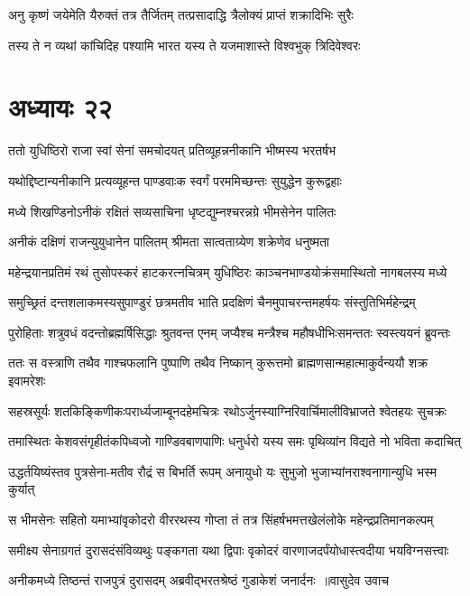 \twolineshloka
{अनु कृष्णं जयेमेति यैरुक्तं तत्र तैर्जितम्}
{तत्प्रसादाद्धि त्रैलोक्यं प्राप्तं शक्रादिभिः सुरैः}


\twolineshloka
{तस्य ते न व्यथां कांचिदिह पश्यामि भारत}
{यस्य ते यजमाशास्ते विश्वभुक् त्रिदिवेश्वरः}


\chapter{अध्यायः २२}
\twolineshloka
{ततो युधिष्ठिरो राजा स्वां सेनां समचोदयत्}
{प्रतिव्यूहन्ननीकानि भीष्मस्य भरतर्षभ}


\twolineshloka
{यथोद्दिष्टान्यनीकानि प्रत्यव्यूहन्त पाण्डवाःक}
{स्वर्गं परममिच्छन्तः सुयुद्धेन कुरूद्वहाः}


\twolineshloka
{मध्ये शिखण्डिनोऽनीकं रक्षितं सव्यसाचिना}
{धृष्टद्युम्नश्चरन्नग्रे भीमसेनेन पालितः}


\twolineshloka
{अनीकं दक्षिणं राजन्युयुधानेन पालितम्}
{श्रीमता सात्वताग्र्येण शक्रेणेव धनुष्मता}


\twolineshloka
{महेन्द्रयानप्रतिमं रथं तुसोपस्करं हाटकरत्नचित्रम्}
{युधिष्ठिरः काञ्चनभाण्डयोक्रंसमास्थितो नागबलस्य मध्ये}


\twolineshloka
{समुच्छ्रितं दन्तशलाकमस्यसुपाण्डुरं छत्रमतीव भाति}
{प्रदक्षिणं चैनमुपाचरन्तमहर्षयः संस्तुतिभिर्महेन्द्रम्}


\twolineshloka
{पुरोहिताः शत्रुवधं वदन्तोब्रह्मर्षिसिद्धाः श्रुतवन्त एनम्}
{जप्यैश्च मन्त्रैश्च महौषधीभिःसमन्ततः स्वस्त्ययनं ब्रुवन्तः}


\twolineshloka
{ततः स वस्त्राणि तथैव गाश्चफलानि पुष्पाणि तथैव निष्कान्}
{कुरूत्तमो ब्राह्मणसान्महात्माकुर्वन्ययौ शक्र इवामरेशः}


\twolineshloka
{सहस्रसूर्यः शतकिङ्किणीकःपरार्ध्यजाम्बूनदहेमचित्रः}
{रथोऽर्जुनस्याग्निरिवार्चिमालीविभ्राजते श्वेतहयः सुचक्रः}


\twolineshloka
{तमास्थितः केशवसंगृहीतंकपिध्वजो गाण्डिवबाणपाणिः}
{धनुर्धरो यस्य समः पृथिव्यांन विद्यते नो भविता कदाचित्}


\twolineshloka
{उद्धर्तयिष्यंस्तव पुत्रसेना-मतीव रौद्रं स बिभर्ति रूपम्}
{अनायुधो यः सुभुजो भुजाभ्यांनराश्वनागान्युधि भस्म कुर्यात्}


\twolineshloka
{स भीमसेनः सहितो यमाभ्यांवृकोदरो वीररथस्य गोप्ता}
{तं तत्र सिंहर्षभमत्तखेलंलोके महेन्द्रप्रतिमानकल्पम्}


\twolineshloka
{समीक्ष्य सेनाग्रगतं दुरासदंसंविव्यथुः पङ्कगता यथा द्विपाः}
{वृकोदरं वारणाजदर्पंयोधास्त्वदीया भयविग्नसत्त्वाः}


\threelineshloka
{अनीकमध्ये तिष्ठन्तं राजपुत्रं दुरासदम्}
{अब्रवीद्भरतश्रेष्ठं गुडाकेशं जनार्दनः ॥वासुदेव उवाच}
{}


